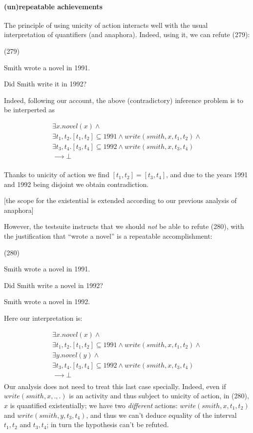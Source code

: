 \documentclass[a4paper,11pt]{article}
\newcommand\hyp{\item[H]}
\newcommand\fracasex[2]{\begin{lingex}\item[(#1)] \begin{subex} #2 \end{subex} \end{lingex} }
\begin{document}
\paragraph{(un)repeatable achievements}
The principle of using unicity of action interacts well with the usual interpretation of quantifiers (and anaphora).
Indeed, using it, we can refute (279):

\fracasex{279}{
\item	Smith wrote a novel in 1991.
\hyp 	Did Smith write it in 1992?
}
Indeed, following our account, the above (contradictory) inference problem is to be
interperted as

\[\begin{array}{l}
∃x. novel(x) ∧ \\
∃t_1,t_2. [t_1,t_2] ⊆ 1991 ∧ write(smith,x,t_1,t_2) ∧ \\
∃t_3,t_4. [t_3,t_4] ⊆ 1992 ∧ write(smith,x,t_3,t_4) \\
⟶ ⊥ \\
\end{array}
\]

Thanks to unicity of action we find \([t_1,t_2] = [t_3,t_4]\), and due
to the years 1991 and 1992 being disjoint we obtain contradiction.

[the scope
for the existential is extended according to our previous analysis of
anaphora]

However, the testsuite instructs that we should \emph{not} be able to refute
(280), with the justification that ``wrote a novel'' is a repeatable
accomplishment:


\fracasex{280}{
\item	Smith wrote a novel in 1991.
\item 	Did Smith write a novel in 1992?
\hyp 	Smith wrote a novel in 1992.
}
Here our interpretation is:

\[\begin{array}{l}
∃x. novel(x) ∧ \\
∃t_1,t_2. [t_1,t_2] ⊆ 1991 ∧ write(smith,x,t_1,t_2) ∧ \\
∃y. novel(y) ∧ \\
∃t_3,t_4. [t_3,t_4] ⊆ 1992 ∧ write(smith,x,t_3,t_4) \\
⟶ ⊥ \\
\end{array}
\]
Our analysis does not need to treat this last case specially. Indeed,
even if $write(smith,x,.,.)$ is an activity and thus subject to
unicity of action, in (280), $x$ is quantified existentially; we have
two \emph{different} actions: $write(smith,x,t_1,t_2)$ and
$write(smith,y,t_3,t_4)$, and thus we can't deduce equality of the
interval $t_1,t_2$ and $t_3,t_4$; in turn the hypothesis can't be refuted.
\end{document}
